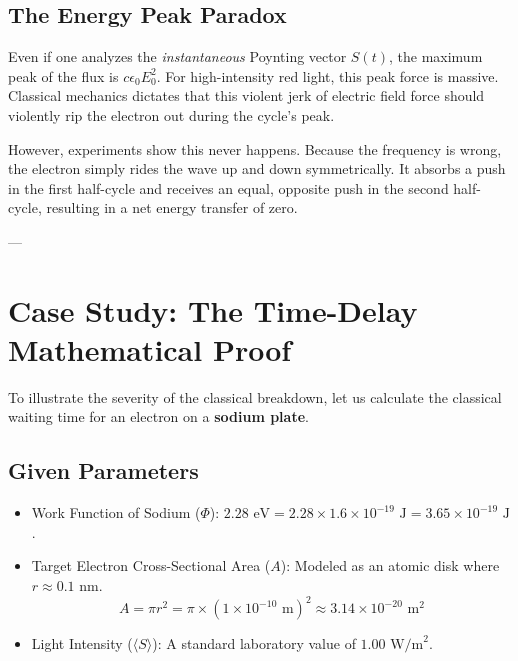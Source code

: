 \documentclass[11pt,a4paper]{article}
\begin{document}
	\subsection{The Energy Peak Paradox}
	Even if one analyzes the \textit{instantaneous} Poynting vector $S(t)$, the maximum peak of the flux is $c \epsilon_0 E_0^2$. For high-intensity red light, this peak force is massive. Classical mechanics dictates that this violent jerk of electric field force should violently rip the electron out during the cycle's peak. 
	
	However, experiments show this never happens. Because the frequency is wrong, the electron simply rides the wave up and down symmetrically. It absorbs a push in the first half-cycle and receives an equal, opposite push in the second half-cycle, resulting in a net energy transfer of zero.
	
	---
	
	\section{Case Study: The Time-Delay Mathematical Proof}
	To illustrate the severity of the classical breakdown, let us calculate the classical waiting time for an electron on a \textbf{sodium plate}.
	
	\subsection{Given Parameters}
	\begin{itemize}
		\item Work Function of Sodium ($\Phi$): $2.28 \text{ eV} = 2.28 \times 1.6 \times 10^{-19} \text{ J} = 3.65 \times 10^{-19} \text{ J}$.
		\item Target Electron Cross-Sectional Area ($A$): Modeled as an atomic disk where $r \approx 0.1 \text{ nm}$.
		\begin{equation}
			A = \pi r^2 = \pi \times (1 \times 10^{-10} \text{ m})^2 \approx 3.14 \times 10^{-20} \text{ m}^2
		\end{equation}
		\item Light Intensity ($\langle S \rangle$): A standard laboratory value of $1.00 \text{ W/m}^2$.
	\end{itemize}
	
\end{document}
